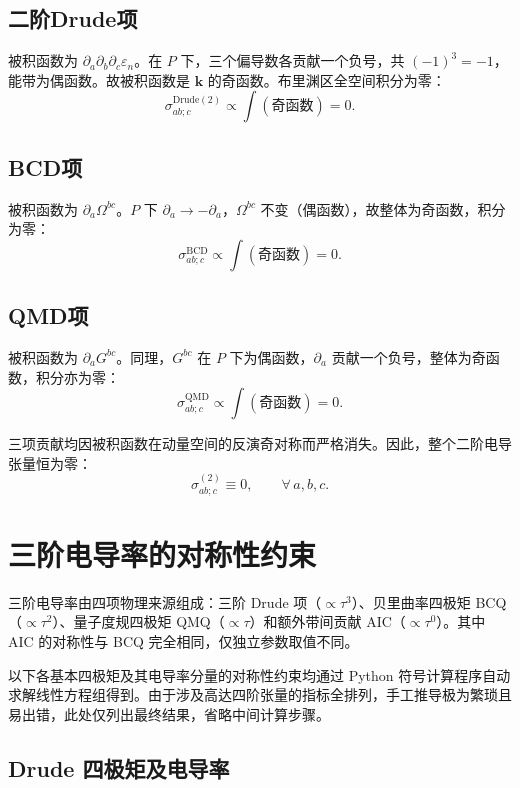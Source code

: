 \subsection{二阶Drude项}
被积函数为 $\partial_a\partial_b\partial_c\varepsilon_n$。在 $P$ 下，三个偏导数各贡献一个负号，共 $(-1)^3=-1$，能带为偶函数。故被积函数是 $\mathbf{k}$ 的奇函数。布里渊区全空间积分为零：
\[
\sigma_{ab;c}^{\mathrm{Drude}(2)} \propto \int (\text{奇函数}) = 0 .
\]

\subsection{BCD项}
被积函数为 $\partial_a\Omega^{bc}$。$P$ 下 $\partial_a\to -\partial_a$，$\Omega^{bc}$ 不变（偶函数），故整体为奇函数，积分为零：
\[
\sigma_{ab;c}^{\mathrm{BCD}} \propto \int (\text{奇函数}) = 0 .
\]

\subsection{QMD项}
被积函数为 $\partial_a G^{bc}$。同理，$G^{bc}$ 在 $P$ 下为偶函数，$\partial_a$ 贡献一个负号，整体为奇函数，积分亦为零：
\[
\sigma_{ab;c}^{\mathrm{QMD}} \propto \int (\text{奇函数}) = 0 .
\]

三项贡献均因被积函数在动量空间的反演奇对称而严格消失。因此，整个二阶电导张量恒为零：
\[
{\sigma_{ab;c}^{(2)} \equiv 0,\qquad \forall\, a,b,c.}
\]

\section{三阶电导率的对称性约束}

三阶电导率由四项物理来源组成：三阶 Drude 项（\(\propto\tau^{3}\)）、贝里曲率四极矩 BCQ（\(\propto\tau^{2}\)）、量子度规四极矩 QMQ（\(\propto\tau\)）和额外带间贡献 AIC（\(\propto\tau^{0}\)）。其中 AIC 的对称性与 BCQ 完全相同，仅独立参数取值不同。

以下各基本四极矩及其电导率分量的对称性约束均通过 Python 符号计算程序自动求解线性方程组得到。由于涉及高达四阶张量的指标全排列，手工推导极为繁琐且易出错，此处仅列出最终结果，省略中间计算步骤。

\subsection{Drude 四极矩及电导率}

